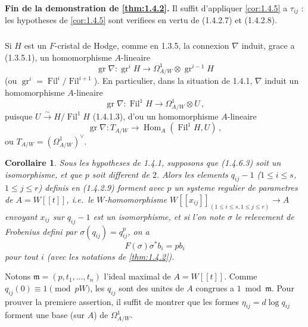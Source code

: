 \documentclass[12pt,a4paper]{article}
\theoremstyle{plain}
\newtheorem{corollary}[theorem]{Corollaire}
\theoremstyle{definition}
\theoremstyle{remark}
\DeclareMathOperator{\Hom}{Hom}
\DeclareMathOperator{\gr}{gr}
\DeclareMathOperator{\Fil}{Fil}
\begin{document}
\textbf{Fin de la demonstration de \ref{thm:1.4.2}.} Il suffit d'appliquer \ref{cor:1.4.5} a $\tau_{ij}$ : les hypotheses de \ref{cor:1.4.5} sont verifiees en vertu de (1.4.2.7) et (1.4.2.8).

\subsubsection{}

Si $H$ est un $F$-cristal de Hodge, comme en 1.3.5, la connexion $\nabla$ induit, grace a (1.3.5.1), un homomorphisme $A$-lineaire
\begin{equation}\label{eq:1.4.6.1}
\gr\nabla : \gr^iH \longrightarrow \Omega^1_{A/W} \otimes \gr^{i-1}H\end{equation}
(ou $\gr^i = \Fil^i/\Fil^{i+1}$). En particulier, dans la situation de 1.4.1, $\nabla$ induit un homomorphisme $A$-lineaire
\begin{equation}\label{eq:1.4.6.2}
\gr\nabla : \Fil^1H \longrightarrow \Omega^1_{A/W} \otimes U\,,
\end{equation}
puisque $U \xrightarrow{\sim} H/\Fil^1H$ (1.4.1.3), d'ou un homomorphisme $A$-lineaire
\begin{equation}\label{eq:1.4.6.3}
\gr\nabla : T_{A/W} \longrightarrow \Hom_A(\Fil^1H, U)\,,
\end{equation}
ou $T_{A/W} = (\Omega^1_{A/W})^\vee$.

\begin{corollary}\label{cor:1.4.7}
Sous les hypotheses de \emph{1.4.1}, supposons que (1.4.6.3) soit un isomorphisme, et que $p$ soit different de $2$. Alors les elements $q_{ij} - 1$ ($1 \leq i \leq s$, $1 \leq j \leq r$) definis en (1.4.2.9) forment avec $p$ un systeme regulier de parametres de $A = W[[t]]$, i.e.\ le $W$-homomorphisme $W[[x_{ij}]]_{(1 \leq i \leq s, 1 \leq j \leq r)} \to A$ envoyant $x_{ij}$ sur $q_{ij} - 1$ est un isomorphisme, et si l'on note $\sigma$ le relevement de Frobenius defini par $\sigma(q_{ij}) = q_{ij}^p$, on a
\begin{equation}\label{eq:1.4.7.1}
F(\sigma)\sigma^*b_i = pb_i\end{equation}
pour tout $i$ (avec les notations de \ref{thm:1.4.2}).
\end{corollary}

Notons $\mathfrak{m} = (p, t_1, \ldots, t_n)$ l'ideal maximal de $A = W[[t]]$. Comme $q_{ij}(0) \equiv 1 \pmod{pW}$, les $q_{ij}$ sont des unites de $A$ congrues a $1 \bmod \mathfrak{m}$. Pour prouver la premiere assertion, il suffit de montrer que les formes $\eta_{ij} = d\log q_{ij}$ forment une base (sur $A$) de $\Omega^1_{A/W}$.
\end{document}

